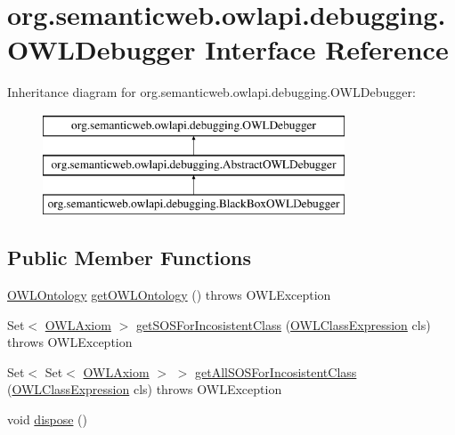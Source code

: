 \hypertarget{interfaceorg_1_1semanticweb_1_1owlapi_1_1debugging_1_1_o_w_l_debugger}{\section{org.\-semanticweb.\-owlapi.\-debugging.\-O\-W\-L\-Debugger Interface Reference}
\label{interfaceorg_1_1semanticweb_1_1owlapi_1_1debugging_1_1_o_w_l_debugger}
}
Inheritance diagram for org.\-semanticweb.\-owlapi.\-debugging.\-O\-W\-L\-Debugger\-:\begin{figure}[H]
\begin{center}
\leavevmode
\includegraphics[height=3.000000cm]{interfaceorg_1_1semanticweb_1_1owlapi_1_1debugging_1_1_o_w_l_debugger}
\end{center}
\end{figure}
\subsection*{Public Member Functions}
\begin{DoxyCompactItemize}
\item 
\hyperlink{interfaceorg_1_1semanticweb_1_1owlapi_1_1model_1_1_o_w_l_ontology}{O\-W\-L\-Ontology} \hyperlink{interfaceorg_1_1semanticweb_1_1owlapi_1_1debugging_1_1_o_w_l_debugger_a87f78f9da4465ea1cb6f4de3e7cbc465}{get\-O\-W\-L\-Ontology} ()  throws O\-W\-L\-Exception
\item 
Set$<$ \hyperlink{interfaceorg_1_1semanticweb_1_1owlapi_1_1model_1_1_o_w_l_axiom}{O\-W\-L\-Axiom} $>$ \hyperlink{interfaceorg_1_1semanticweb_1_1owlapi_1_1debugging_1_1_o_w_l_debugger_ac6ce82d4632962cacfe8a225ba560822}{get\-S\-O\-S\-For\-Incosistent\-Class} (\hyperlink{interfaceorg_1_1semanticweb_1_1owlapi_1_1model_1_1_o_w_l_class_expression}{O\-W\-L\-Class\-Expression} cls)  throws O\-W\-L\-Exception
\item 
Set$<$ Set$<$ \hyperlink{interfaceorg_1_1semanticweb_1_1owlapi_1_1model_1_1_o_w_l_axiom}{O\-W\-L\-Axiom} $>$ $>$ \hyperlink{interfaceorg_1_1semanticweb_1_1owlapi_1_1debugging_1_1_o_w_l_debugger_a55ae8b3833aa148d6cbdeec91d3c5c99}{get\-All\-S\-O\-S\-For\-Incosistent\-Class} (\hyperlink{interfaceorg_1_1semanticweb_1_1owlapi_1_1model_1_1_o_w_l_class_expression}{O\-W\-L\-Class\-Expression} cls)  throws O\-W\-L\-Exception
\item 
void \hyperlink{interfaceorg_1_1semanticweb_1_1owlapi_1_1debugging_1_1_o_w_l_debugger_aad12d57c58bb1422ce4045b989d65644}{dispose} ()
\end{DoxyCompactItemize}


